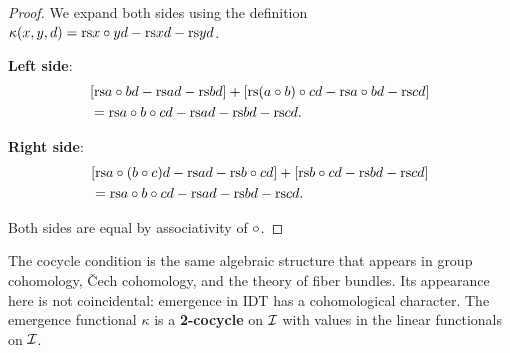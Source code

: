 \begin{proof}
We expand both sides using the definition $\kappa(x, y, d) =
\mathrm{rs}{x \circ y}{d} - \mathrm{rs}{x}{d} - \mathrm{rs}{y}{d}$.

\textbf{Left side}:
\begin{align*}
  &[\mathrm{rs}{a \circ b}{d} - \mathrm{rs}{a}{d} - \mathrm{rs}{b}{d}]
  + [\mathrm{rs}{(a \circ b) \circ c}{d} - \mathrm{rs}{a \circ b}{d} - \mathrm{rs}{c}{d}] \\
  &= \mathrm{rs}{a \circ b \circ c}{d} - \mathrm{rs}{a}{d} - \mathrm{rs}{b}{d} - \mathrm{rs}{c}{d}.
\end{align*}

\textbf{Right side}:
\begin{align*}
  &[\mathrm{rs}{a \circ (b \circ c)}{d} - \mathrm{rs}{a}{d} - \mathrm{rs}{b \circ c}{d}]
  + [\mathrm{rs}{b \circ c}{d} - \mathrm{rs}{b}{d} - \mathrm{rs}{c}{d}] \\
  &= \mathrm{rs}{a \circ b \circ c}{d} - \mathrm{rs}{a}{d} - \mathrm{rs}{b}{d} - \mathrm{rs}{c}{d}.
\end{align*}

Both sides are equal by associativity of $\circ$.
\end{proof}

\begin{remark}
The cocycle condition is the same algebraic structure that appears in group
cohomology, \v{C}ech cohomology, and the theory of fiber bundles.  Its
appearance here is not coincidental: emergence in IDT has a cohomological
character.  The emergence functional $\kappa$ is a \textbf{2-cocycle} on $\mathcal{I}$
with values in the linear functionals on $\mathcal{I}$.
\end{remark}

